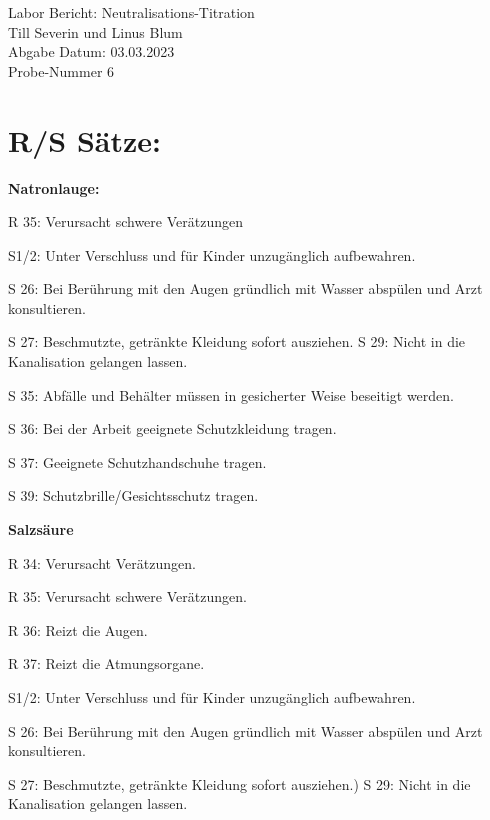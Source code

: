 \documentclass{report}
\begin{document}
\begin{titlepage}
\centering

\LARGE{Labor Bericht: Neutralisations-Titration}\\
\vspace{20pt}
\large{Till Severin und Linus Blum}\\
\vspace{20pt}
\large{Abgabe Datum: 03.03.2023}\\
\vspace{20pt}
\large{Probe-Nummer 6}\\

\end{titlepage}

\section{R/S S\"atze:} %
\label{sec:R/S S"atze:}
\textbf{Natronlauge:}

R 35: Verursacht schwere Verätzungen

S1/2: Unter Verschluss und für Kinder unzugänglich aufbewahren.

S 26: Bei Berührung mit den Augen gründlich mit Wasser abspülen und Arzt konsultieren.

S 27: Beschmutzte, getränkte Kleidung sofort ausziehen. S 29: Nicht in die Kanalisation gelangen lassen.

S 35: Abfälle und Behälter müssen in gesicherter Weise beseitigt werden.

S 36: Bei der Arbeit geeignete Schutzkleidung tragen.

S 37: Geeignete Schutzhandschuhe tragen.

S 39: Schutzbrille/Gesichtsschutz tragen.

\vspace{20pt}
\textbf{Salzs\"aure}

R 34: Verursacht Verätzungen.

R 35: Verursacht schwere Verätzungen.

R 36: Reizt die Augen.

R 37: Reizt die Atmungsorgane.

S1/2: Unter Verschluss und für Kinder unzugänglich aufbewahren.

S 26: Bei Berührung mit den Augen gründlich mit Wasser abspülen und Arzt konsultieren.

S 27: Beschmutzte, getränkte Kleidung sofort ausziehen.) S 29: Nicht in die Kanalisation gelangen lassen.
\end{document}
